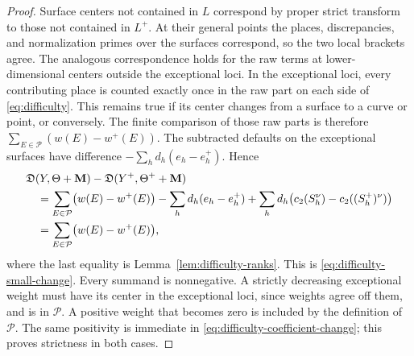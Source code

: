 \begin{proof}
Surface centers not contained in \(L\) correspond by proper strict
transform to those not contained in \(L^+\).  At their general points the
places, discrepancies, and normalization primes over the surfaces
correspond, so the two local brackets agree.  The analogous correspondence
holds for the raw terms at lower-dimensional centers outside the exceptional
loci.  In the exceptional loci, every contributing place is counted exactly
once in the raw part on each side of \eqref{eq:difficulty}.  This remains
true if its center changes from a surface to a curve or point, or conversely.
The finite comparison of those raw parts is therefore
\(\sum_{E\in\mathcal P}(w(E)-w^+(E))\).  The subtracted defaults on the
exceptional surfaces have difference \(-\sum_h d_h(e_h-e_h^+)\).  Hence
\begin{align*}
 &\mathfrak D(Y,\Theta+\mathbf{M})-\mathfrak D(Y^+,\Theta^++\mathbf{M})\\
 &\quad=\sum_{E\in\mathcal P}\bigl(w(E)-w^+(E)\bigr)
       -\sum_h d_h(e_h-e_h^+)
       +\sum_h d_h\bigl(c_2(S_h^\nu)-c_2((S_h^+)^\nu)\bigr)\\
 &\quad=\sum_{E\in\mathcal P}\bigl(w(E)-w^+(E)\bigr),
\end{align*}
where the last equality is Lemma~\ref{lem:difficulty-ranks}.  This is
\eqref{eq:difficulty-small-change}.  Every summand is nonnegative.  A
strictly decreasing exceptional weight must have its center in the
exceptional loci, since weights agree off them, and is in \(\mathcal P\).
A positive weight that becomes zero is included by the definition of
\(\mathcal P\).  The same positivity is immediate in
\eqref{eq:difficulty-coefficient-change}; this proves strictness in both
cases.
\end{proof}
